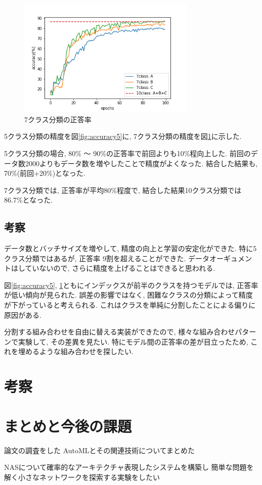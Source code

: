 \documentclass[twocolumn]{jarticle}     %
\begin{document}
\begin{figure}[tb]
	\begin{center}
		\includegraphics[clip,width=8.5cm]{accuracy7.png}
		\caption{7クラス分類の正答率}
		\label{fig:accuracy7}
	\end{center}
\end{figure}

5クラス分類の精度を図\ref{fig:accuracy5}に, 7クラス分類の精度を図\ref{fig:accuracy7}に示した.

5クラス分類の場合, 80\% ～ 90\%の正答率で前回よりも10\%程向上した. 前回のデータ数2000よりもデータ数を増やしたことで精度がよくなった. 結合した結果も, 70\%(前回+20\%)となった.

7クラス分類では, 正答率が平均80\%程度で, 結合した結果10クラス分類では86.7\%となった.

\subsection{考察}
データ数とバッチサイズを増やして, 精度の向上と学習の安定化ができた. 特に5クラス分類ではあるが, 正答率 9割を超えることができた. データオーギュメントはしていないので, さらに精度を上げることはできると思われる.

図\ref{fig:accuracy5}, \ref{fig:accuracy7}ともにインデックスが前半のクラスを持つモデルでは, 正答率が低い傾向が見られた. 誤差の影響ではなく, 困難なクラスの分類によって精度が下がっていると考えられる. これはクラスを単純に分割したことによる偏りに原因がある.

分割する組み合わせを自由に替える実装ができたので, 様々な組み合わせパターンで実験して, その差異を見たい.
特にモデル間の正答率の差が目立ったため, これを埋めるような組み合わせを探したい.


\section{考察}

\section{まとめと今後の課題}
論文の調査をした
AutoMLとその関連技術についてまとめた

NASについて確率的なアーキテクチャ表現したシステムを構築し
簡単な問題を解く小さなネットワークを探索する実験をしたい



\end{document}
